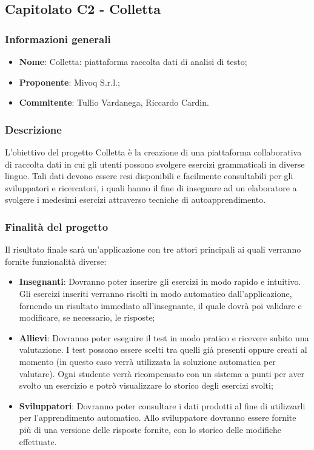 \subsection{Capitolato C2 - Colletta} 
\subsubsection{Informazioni generali}
\begin{itemize}
	\item \textbf{Nome}: Colletta: piattaforma raccolta dati di analisi di testo;
	\item \textbf{Proponente}: Mivoq S.r.l.;
	\item \textbf{Commitente}: Tullio Vardanega, Riccardo Cardin.
\end{itemize}
\subsubsection{Descrizione}
L'obiettivo del progetto Colletta è la creazione di una piattaforma collaborativa di raccolta dati in cui gli utenti possono svolgere esercizi grammaticali in diverse lingue. Tali dati devono essere resi disponibili e facilmente consultabili per gli sviluppatori e ricercatori, i quali hanno il fine di insegnare ad un elaboratore a svolgere i medesimi esercizi attraverso tecniche di autoapprendimento.
\subsubsection{Finalità del progetto}
Il risultato finale sarà un'applicazione con tre attori principali ai quali verranno fornite funzionalità diverse:
\begin{itemize}
	\item \textbf{Insegnanti}: Dovranno poter inserire gli esercizi in modo rapido e intuitivo. Gli esercizi inseriti verranno risolti in modo automatico dall'applicazione, fornendo un risultato immediato all'insegnante, il quale dovrà poi validare e modificare, se necessario, le risposte;
	\item \textbf{Allievi}: Dovranno poter eseguire il test in modo pratico e ricevere subito una valutazione. I test possono essere scelti tra quelli già presenti oppure creati al momento (in questo caso verrà utilizzata la soluzione automatica per valutare). Ogni studente verrà ricompensato con un sistema a punti per aver svolto un esercizio e potrò visualizzare lo storico degli esercizi svolti;
	\item \textbf{Sviluppatori}: Dovranno poter consultare i dati prodotti al fine di utilizzarli per l'apprendimento automatico. Allo sviluppatore dovranno essere fornite più di una versione delle risposte fornite, con lo storico delle modifiche effettuate.
\end{itemize}
